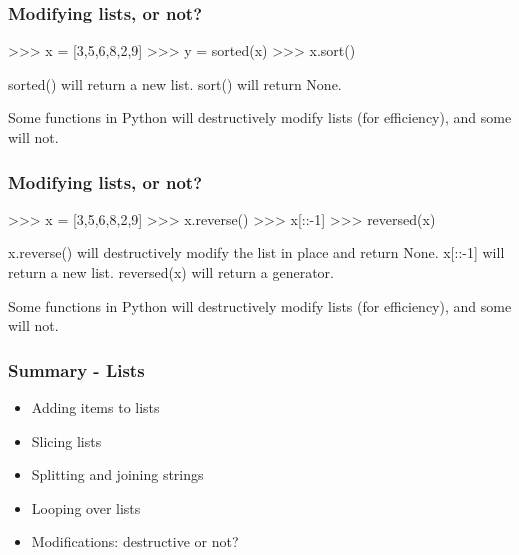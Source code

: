 \documentclass{beamer}
\begin{document}
\begin{frame}[fragile]
\frametitle{Modifying lists, or not?}
\begin{code}
>>> x = [3,5,6,8,2,9]
>>> y = sorted(x)
>>> x.sort()
\end{code}

sorted() will return a new list. sort() will return None.

\bigskip

Some functions in Python will destructively modify lists (for
efficiency), and some will not. 
\end{frame}

\begin{frame}[fragile]
\frametitle{Modifying lists, or not?}
\begin{code}
>>> x = [3,5,6,8,2,9]
>>> x.reverse()
>>> x[::-1]
>>> reversed(x)
\end{code}

x.reverse() will destructively modify the list in place and return None. x[::-1] will
return a new list. reversed(x) will return a generator. 

\bigskip

Some functions in Python will destructively modify lists (for
efficiency), and some will not. 
\end{frame}

\begin{frame}[fragile]
\frametitle{Summary - Lists}
\begin{itemize}
\item Adding items to lists
\item Slicing lists
\item Splitting and joining strings
\item Looping over lists
\item Modifications: destructive or not?
\end{itemize}
\end{frame}
\end{document}
